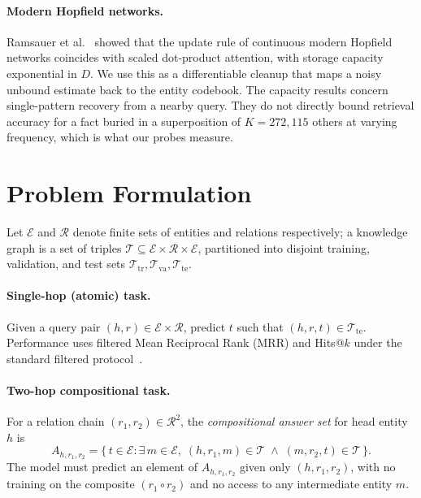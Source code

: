\documentclass[11pt]{article}
\theoremstyle{definition}
\begin{document}
\paragraph{Modern Hopfield networks.}
Ramsauer et al.~\cite{ramsauer2021hopfield} showed that the update rule of
continuous modern Hopfield networks coincides with scaled dot-product attention,
with storage capacity exponential in $D$. We use this as a differentiable
cleanup that maps a noisy unbound estimate back to the entity codebook. The
capacity results concern single-pattern recovery from a nearby query. They do
not directly bound retrieval accuracy for a fact buried in a superposition of
$K = 272{,}115$ others at varying frequency, which is what our probes measure.

\section{Problem Formulation}
\label{sec:problem}

Let $\mathcal{E}$ and $\mathcal{R}$ denote finite sets of entities and
relations respectively; a knowledge graph is a set of triples
$\mathcal{T} \subseteq \mathcal{E} \times \mathcal{R} \times \mathcal{E}$,
partitioned into disjoint training, validation, and test sets
$\mathcal{T}_{\mathrm{tr}}, \mathcal{T}_{\mathrm{va}}, \mathcal{T}_{\mathrm{te}}$.

\paragraph{Single-hop (atomic) task.}
Given a query pair $(h, r) \in \mathcal{E} \times \mathcal{R}$, predict $t$
such that $(h, r, t) \in \mathcal{T}_{\mathrm{te}}$. Performance uses filtered
Mean Reciprocal Rank (MRR) and Hits@$k$ under the standard filtered
protocol~\cite{bordes2013transe}.

\paragraph{Two-hop compositional task.}
For a relation chain $(r_1, r_2) \in \mathcal{R}^2$, the \emph{compositional
answer set} for head entity $h$ is
\begin{equation}
A_{h,r_1,r_2}
  = \bigl\{\, t \in \mathcal{E} : \exists\, m \in \mathcal{E},\;
    (h, r_1, m) \in \mathcal{T} \;\wedge\; (m, r_2, t) \in \mathcal{T} \,\bigr\}.
\label{eq:composition-set}
\end{equation}
The model must predict an element of $A_{h,r_1,r_2}$ given only $(h, r_1, r_2)$,
with no training on the composite $(r_1 \circ r_2)$ and no access to any
intermediate entity $m$.
\end{document}

